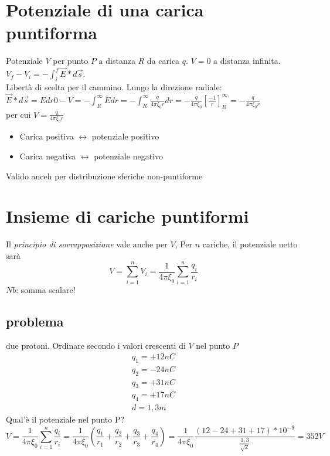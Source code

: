 \section{Potenziale di una carica puntiforma}
Potenziale $V$ per punto $P$ a distanza $R$ da carica $q$. $V=0$ a distanza infinita. $V_f-V_i=-\int^f_i\vec{E}*d\vec{s}$.\\
Libertà di scelta per il cammino. Lungo la direzione radiale: $\vec{E}*d\vec{s}=Edr0-V=-\int^\infty_REdr=-\int^\infty_R\frac{q}{4\pi \xi_0r}dr=-\frac{q}{4\pi \xi_0}\left[\frac{-1}{r}\right]^\infty_R=-\frac{q}{4\pi \xi_0 r}$\\
per cui $V=\frac{q}{4\pi\xi_or}$
\begin{itemize}
\item Carica positiva $\leftrightarrow$ potenziale positivo
\item Carica negativa $\leftrightarrow$ potenziale negativo
\end{itemize}
Valido anceh per distribuzione sferiche non-puntiforme
\section{Insieme di cariche puntiformi}
Il \textit{principio di sovrapposizione} vale anche per $V$, Per $n$ cariche, il potenziale netto sarà
\begin{equation}
  V=\sum_{i=1}^{n}V_i=\frac{1}{4\pi \xi_0}\sum_{i=1}^{n}\frac{q_i}{r_i}
\end{equation}
$Nb$: somma scalare!
\subsection{problema}
due protoni. Ordinare secondo i valori crescenti di $V$ nel punto $P$
\begin{equation}
  \begin{matrix}
    q_1=+12nC\\
    q_2=-24nC\\
    q_3=+31nC\\
    q_4=+17nC\\
    d=1,3m
  \end{matrix}
\end{equation}
Qual'è il potenziale nel punto P?
\begin{equation}
  V=\frac{1}{4\pi \xi_0}\sum_{i=1}^{n}\frac{q_i}{r_i}=
  \frac{1}{4\pi\xi_0}\left(\frac{q_1}{r_1}+\frac{q_2}{r_2}+\frac{q_3}{r_3}
    +\frac{q_4}{r_4}\right)=\frac{1}{4\pi\xi_0}
  \frac{(12-24+31+17)*10^{-9}}{\frac{1,3}{\sqrt{2}}}=352V
\end{equation}
